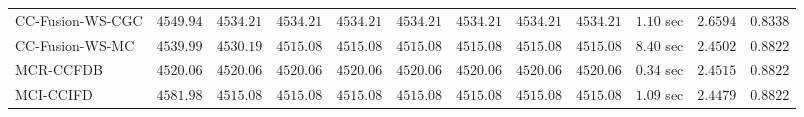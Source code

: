\begin{table}[H]
\begin{tabular}{lrrrrrrrrrrr}
    CC-Fusion-WS-CGC & $      4549.94$ & $      4534.21$ & $      4534.21$ & $      4534.21$ & $      4534.21$ & $      4534.21$ & $      4534.21$ & $      4534.21$ & $         1.10$ sec    & $       2.6594$  & $       0.8338$ \\ 
     CC-Fusion-WS-MC & $      4539.99$ & $      4530.19$ & $      4515.08$ & $      4515.08$ & $      4515.08$ & $      4515.08$ & $      4515.08$ & $      4515.08$ & $         8.40$ sec    & $       2.4502$  & $       0.8822$ \\ 
\cmidrule{1-1} 
           MCR-CCFDB & $      4520.06$ & $      4520.06$ & $      4520.06$ & $      4520.06$ & $      4520.06$ & $      4520.06$ & $      4520.06$ & $      4520.06$ & $         0.34$ sec    & $       2.4515$  & $       0.8822$ \\ 
\cmidrule{1-1} 
           MCI-CCIFD & $      4581.98$ & $      4515.08$ & $      4515.08$ & $      4515.08$ & $      4515.08$ & $      4515.08$ & $      4515.08$ & $      4515.08$ & $         1.09$ sec    & $       2.4479$  & $       0.8822$ \\ 
\bottomrule
\end{tabular}
\end{table}

